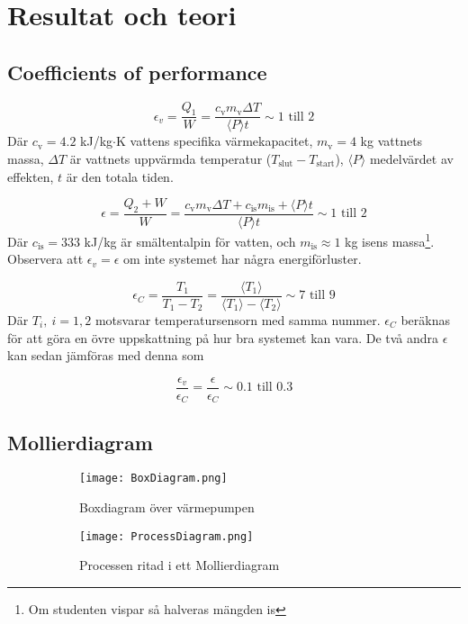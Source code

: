 \documentclass[11pt]{article}
\begin{document}
\section{Resultat och teori}

\subsection{Coefficients of performance}

\begin{equation}
    \epsilon_v = \frac{Q_1}{W} = \frac{c_{\text{v}} m_{\text{v}} \Delta T}{\langle P \rangle t} \sim 1 \text{ till } 2
\end{equation}
Där $c_{\text{v}} = 4.2$ kJ/kg$\cdot$K vattens specifika värmekapacitet, $m_{\text{v}} = 4$ kg vattnets massa, $\Delta T$ är vattnets uppvärmda temperatur ($T_{\text{slut}} -T_{\text{start}}$), $\langle P \rangle$ medelvärdet av effekten, $t$ är den totala tiden.

\begin{equation}
    \epsilon = \frac{Q_2 + W}{W} = \frac{c_{\text{v}} m_{\text{v}} \Delta T + c_{\text{is}} m_{\text{is}} + \langle P \rangle t}{\langle P \rangle t} \sim 1 \text{ till } 2
\end{equation}
Där $c_{\text{is}} = 333$ kJ/kg är smältentalpin för vatten, och $m_{\text{is}} \approx 1$ kg isens massa\footnote{Om studenten vispar så halveras mängden is}. Observera att $\epsilon_v = \epsilon$ om inte systemet har några energiförluster.

\begin{equation}
    \epsilon_C = \frac{T_1}{T_1 - T_2} = \frac{\langle T_1 \rangle}{\langle T_1 \rangle - \langle T_2 \rangle} \sim 7 \text{ till } 9
\end{equation}
Där $T_i, \ i = 1, 2$ motsvarar temperatursensorn med samma nummer. $\epsilon_C$ beräknas för att göra en övre uppskattning på hur bra systemet kan vara. De två andra $\epsilon$ kan sedan jämföras med denna som

\begin{equation}
    \frac{\epsilon_v}{\epsilon_C} = \frac{\epsilon}{\epsilon_C} \sim 0.1 \text{ till } 0.3
\end{equation}

\subsection{Mollierdiagram}


\begin{figure}[h]
\centering
\begin{subfigure}{.5\textwidth}
  \centering
  \texttt{[image: BoxDiagram.png]}
  \caption{Boxdiagram över värmepumpen}
  \label{Fig: Boxdiagram över värmepumpen}
\end{subfigure}%
\begin{subfigure}{.5\textwidth}
  \centering
  \texttt{[image: ProcessDiagram.png]}
  \caption{Processen ritad i ett Mollierdiagram}
  \label{Fig: Processen ritad i ett Mollierdiagram}
\end{subfigure}
\caption{}
\end{figure}
\end{document}
